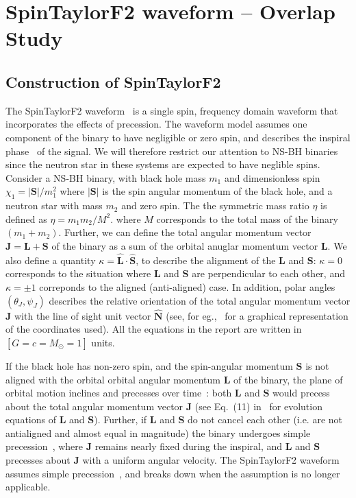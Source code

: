 \chapter{SpinTaylorF2 waveform -- Overlap Study} 

\label{chap:SpinTaylorF2} 
\section{Construction of SpinTaylorF2} 

The SpinTaylorF2 waveform~\cite{Lundgren2014} is a single spin, frequency domain
waveform that incorporates the effects of precession.  The waveform model
assumes one component of the binary to have negligible or zero spin, and
describes the inspiral phase~\cite{Event_0} of the signal. We will therefore
restrict our attention to NS-BH binaries since the neutron star in these systems
are expected to have neglible spins. Consider a NS-BH binary, with black hole
mass $m_{1}$ and dimensionless spin $\chi_{1} = |\mathbf{S}|/m_{1}^2$ where
$|\mathbf{S}|$ is the spin angular momentum of the black hole, and a neutron
star with mass $m_{2}$ and zero spin. The the symmetric mass ratio $\eta$ is
defined as $\eta=m_{1}m_{2}/M^2$. where $M$ corresponds to the total mass of the
binary $(m_{1} + m_{2})$.  Further, we can define the total angular momentum
vector $\mathbf{J}=\mathbf{L} + \mathbf{S}$ of the binary as a sum of the
orbital anuglar momentum vector $\mathbf{L}$. We also define a quantity
$\kappa=\hat{\mathbf{L}}\cdot\hat{\mathbf{S}}$, to describe the alignment of the
$\mathbf{L}$ and $\mathbf{S}$: $\kappa=0$ corresponds to the situation where
$\mathbf{L}$ and $\mathbf{S}$ are perpendicular to each other, and $\kappa=\pm
1$ correponds to the aligned (anti-aligned) case. In addition, polar angles
$(\theta_{J}, \psi_{J})$  describes the relative orientation  of the total
angular momentum vector $\mathbf{J}$ with the line of sight unit vector
$\hat{\mathbf{N}}$ (see, for eg.,~\cite{thetaJ} for a graphical representation
of the coordinates used). All the equations in the report are written in 
$\left[G = c = M_{\odot }= 1\right]$ units.

If the black hole has non-zero spin, and the spin-angular momentum $\mathbf{S}$
is  not aligned with the orbital orbital angular momentum $\mathbf{L}$ of the
binary, the plane of orbital motion inclines and precesses over
time~\cite{Apostolatos1994}: both $\mathbf{L}$ and $\mathbf{S}$  would precess
about the total angular momentum vector $\mathbf{J}$ (see Eq.~(11)
in~\cite{Apostolatos1994} for evolution equations of $\mathbf{L}$ and
$\mathbf{S}$). Further, if $\mathbf{L}$ and $\mathbf{S}$ do not cancel each
other (i.e. are not antialigned and almost equal in magnitude)  the binary
undergoes simple precession~\cite{Apostolatos1994}, where $\mathbf{J}$ remains
nearly fixed during the inspiral, and $\mathbf{L}$ and $\mathbf{S}$ precesses
about $\mathbf{J}$ with a uniform angular velocity. The SpinTaylorF2 waveform
assumes simple precession~\cite{Lundgren2014}, and breaks down  when the
assumption is no longer applicable.

